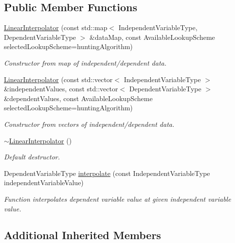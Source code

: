 \subsection*{Public Member Functions}
\begin{DoxyCompactItemize}
\item 
\hyperlink{classtudat_1_1interpolators_1_1LinearInterpolator_a052c1a959155c9f965a6d4b80f9e368b}{Linear\+Interpolator} (const std\+::map$<$ Independent\+Variable\+Type, Dependent\+Variable\+Type $>$ \&data\+Map, const Available\+Lookup\+Scheme selected\+Lookup\+Scheme=hunting\+Algorithm)
\begin{DoxyCompactList}\small\item\em Constructor from map of independent/dependent data. \end{DoxyCompactList}\item 
\hyperlink{classtudat_1_1interpolators_1_1LinearInterpolator_aeec6d571de4036786bec6223af54d949}{Linear\+Interpolator} (const std\+::vector$<$ Independent\+Variable\+Type $>$ \&independent\+Values, const std\+::vector$<$ Dependent\+Variable\+Type $>$ \&dependent\+Values, const Available\+Lookup\+Scheme selected\+Lookup\+Scheme=hunting\+Algorithm)
\begin{DoxyCompactList}\small\item\em Constructor from vectors of independent/dependent data. \end{DoxyCompactList}\item 
\hyperlink{classtudat_1_1interpolators_1_1LinearInterpolator_a1e3717d8a457644d561e0df9640e2862}{$\sim$\+Linear\+Interpolator} ()
\begin{DoxyCompactList}\small\item\em Default destructor. \end{DoxyCompactList}\item 
Dependent\+Variable\+Type \hyperlink{classtudat_1_1interpolators_1_1LinearInterpolator_af693119bb532933f08f1c4a813072040}{interpolate} (const Independent\+Variable\+Type independent\+Variable\+Value)
\begin{DoxyCompactList}\small\item\em Function interpolates dependent variable value at given independent variable value. \end{DoxyCompactList}\end{DoxyCompactItemize}
\subsection*{Additional Inherited Members}


